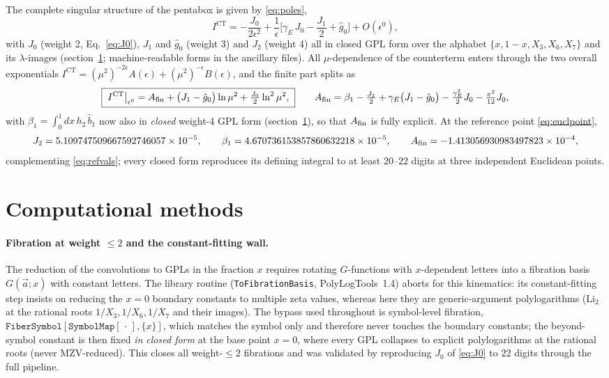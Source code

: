 \documentclass[11pt]{article}
\newcommand{\eps}{\epsilon}
\newcommand{\CT}{\mathrm{CT}}
\begin{document}
The complete singular structure of the pentabox is given by \eqref{eq:poles},
\begin{equation}
I^{\CT}
=-\frac{J_{0}}{2\eps^{2}}
+\frac{1}{\eps}\Big[\gamma_E\,J_{0}-\frac{J_{1}}{2}+\hat g_{0}\Big]
+O(\eps^{0}),
\end{equation}
with $J_0$ (weight 2, Eq.~\eqref{eq:J0}), $J_1$ and $\hat g_0$ (weight 3) and $J_2$ (weight 4)
all in closed GPL form over the alphabet $\{x,1-x,X_3,X_6,X_7\}$ and its $\lambda$-images
(section~\ref{sec:methods}; machine-readable forms in the ancillary files). All $\mu$-dependence
of the counterterm enters through the two overall exponentials
$I^{\CT}=(\mu^2)^{-2\eps}A(\eps)+(\mu^2)^{-\eps}B(\eps)$, and the finite part splits as
\begin{equation}
\boxed{\;
I^{\CT}\big|_{\eps^0}=A_{\rm fin}+\big(J_1-\hat g_0\big)\ln\mu^2+\tfrac{J_0}{2}\ln^2\mu^2,\;}
\qquad
A_{\rm fin}=\beta_1-\tfrac{J_2}{2}+\gamma_E\big(J_1-\hat g_0\big)
-\tfrac{\gamma_E^2}{2}J_0-\tfrac{\pi^2}{12}J_0,
\label{eq:finres}
\end{equation}
with $\beta_1=\int_0^1dx\,h_2\,\hat b_1$ now also in \emph{closed} weight-4 GPL form
(section~\ref{sec:methods}), so that $A_{\rm fin}$ is fully explicit. At the reference point
\eqref{eq:euclpoint},
\begin{equation}
J_2=5.109747509667592746057\times10^{-5},\qquad
\beta_1=4.670736153857860632218\times10^{-5},\qquad
A_{\rm fin}=-1.413056930983497823\times10^{-4},
\end{equation}
complementing \eqref{eq:refvals}; every closed form reproduces its defining integral to at
least $20$--$22$ digits at three independent Euclidean points.

\section{Computational methods}
\label{sec:methods}

\paragraph{Fibration at weight $\le2$ and the constant-fitting wall.}
The reduction of the convolutions to GPLs in the fraction $x$ requires rotating
$G$-functions with $x$-dependent letters into a fibration basis $G(\vec a;x)$ with constant
letters. The library routine (\texttt{ToFibrationBasis}, PolyLogTools~1.4) aborts for this
kinematics: its constant-fitting step insists on reducing the $x=0$ boundary constants to
multiple zeta values, whereas here they are generic-argument polylogarithms
($\mathrm{Li}_2$ at the rational roots $1/X_3,1/X_6,1/X_7$ and their images). The bypass used
throughout is symbol-level fibration, $\texttt{FiberSymbol}[\texttt{SymbolMap}[\,\cdot\,],\{x\}]$,
which matches the symbol only and therefore never touches the boundary constants; the
beyond-symbol constant is then fixed \emph{in closed form} at the base point $x=0$, where every
GPL collapses to explicit polylogarithms at the rational roots (never MZV-reduced). This closes
all weight-$\le2$ fibrations and was validated by reproducing $J_0$ of \eqref{eq:J0} to $22$
digits through the full pipeline.
\end{document}

